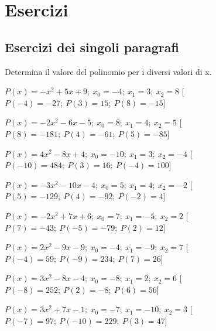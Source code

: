 
\section{Esercizi}

\subsection{Esercizi dei singoli paragrafi}

\begin{esercizio}\label{ese:}
 Determina il valore del polinomio per i diversi valori di x.
 \begin{enumeratea}
  \item  $P(x)=- x^2 +5 x +9;~x_0=-4;~x_1=3;~x_2=8$
   \hfill [$P(-4)=-27;~P(3)=15;~P(8)=-15$]
  \item  $P(x)=-2 x^2 -6 x -5;~x_0=8;~x_1=4;~x_2=5$
   \hfill [$P(8)=-181;~P(4)=-61;~P(5)=-85$]
  \item  $P(x)=4 x^2 -8 x +4;~x_0=-10;~x_1=3;~x_2=-4$
   \hfill [$P(-10)=484;~P(3)=16;~P(-4)=100$]
  \item  $P(x)=-3 x^2 -10 x -4;~x_0=5;~x_1=4;~x_2=-2$
   \hfill [$P(5)=-129;~P(4)=-92;~P(-2)=4$]
  \item  $P(x)=-2 x^2 +7 x +6;~x_0=7;~x_1=-5;~x_2=2$
   \hfill [$P(7)=-43;~P(-5)=-79;~P(2)=12$]
  \item  $P(x)=2 x^2 -9 x -9;~x_0=-4;~x_1=-9;~x_2=7$
   \hfill [$P(-4)=59;~P(-9)=234;~P(7)=26$]
  \item  $P(x)=3 x^2 -8 x -4;~x_0=-8;~x_1=2;~x_2=6$
   \hfill [$P(-8)=252;~P(2)=-8;~P(6)=56$]
  \item  $P(x)=3 x^2 +7 x -1;~x_0=-7;~x_1=-10;~x_2=3$
   \hfill [$P(-7)=97;~P(-10)=229;~P(3)=47$]
 \end{enumeratea}
\end{esercizio}

